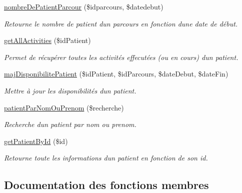 \begin{DoxyCompactItemize}
\hyperlink{class_m___patient_a6a24b9381e5a3c218fd5fac44ceee18f}{nombre\+De\+Patient\+Parcour} (\$idparcours, \$datedebut)
\begin{DoxyCompactList}\small\item\em Retourne le nombre de patient d\textquotesingle{}un parcours en fonction d\textquotesingle{}une date de début. \end{DoxyCompactList}\item 
\hyperlink{class_m___patient_a7c2dbb60dd76caa57488fc721758a2fe}{get\+All\+Activities} (\$id\+Patient)
\begin{DoxyCompactList}\small\item\em Permet de récupérer toutes les activités effecutées (ou en cours) d\textquotesingle{}un patient. \end{DoxyCompactList}\item 
\hyperlink{class_m___patient_aad31452d1a9feb24d210dd6c5b7d8889}{maj\+Disponibilite\+Patient} (\$id\+Patient, \$id\+Parcours, \$date\+Debut, \$date\+Fin)
\begin{DoxyCompactList}\small\item\em Mettre à jour les disponibilités d\textquotesingle{}un patient. \end{DoxyCompactList}\item 
\hyperlink{class_m___patient_ae756ff875e1058f4259c39f8ab801a29}{patient\+Par\+Nom\+Ou\+Prenom} (\$recherche)
\begin{DoxyCompactList}\small\item\em Recherche d\textquotesingle{}un patient par nom ou prenom. \end{DoxyCompactList}\item 
\hyperlink{class_m___patient_aac67ed7396fd641e440458843e24f8f5}{get\+Patient\+By\+Id} (\$id)
\begin{DoxyCompactList}\small\item\em Retourne toute les informations d\textquotesingle{}un patient en fonction de son id. \end{DoxyCompactList}\end{DoxyCompactItemize}


\subsection{Documentation des fonctions membres}
\mbox{\label{class_m___patient_a052c759daf4e12f106ad1f87918dd3e1}} 
